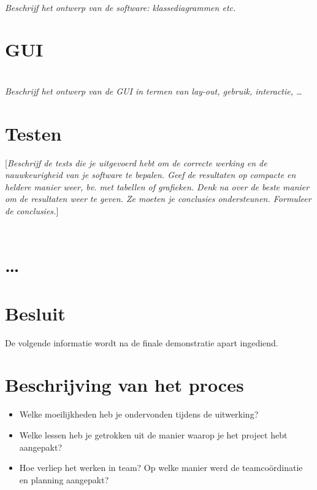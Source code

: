 \documentclass[tt]{penoverslag}
\begin{document}
\\

{\em Beschrijf het ontwerp van de software: klassediagrammen etc.}



\section{GUI}

\\

{\em Beschrijf het ontwerp van de GUI in termen van lay-out, gebruik, interactie, \ldots}


\section{Testen}

[{\em Beschrijf de tests die je uitgevoerd hebt om de correcte werking en de nauwkeurigheid van je software te bepalen.  Geef de resultaten op compacte en heldere manier weer, bv. met tabellen of grafieken.  Denk na over de beste manier om de resultaten weer te geven.  Ze moeten je conclusies ondersteunen.  Formuleer de conclusies.}]\\

\\




\section{\ldots}


\section{Besluit}






\newpage\makeappendix

De volgende informatie wordt na de finale demonstratie apart ingediend.

\section{Beschrijving van het proces}
\begin{itemize}
\item Welke moeilijkheden heb je ondervonden tijdens de uitwerking?
\item Welke lessen heb je getrokken uit de manier waarop je het project hebt aangepakt?
\item Hoe verliep het werken in team? Op welke manier werd de teamco\"ordinatie en planning aangepakt?
\end{itemize}
\end{document}
